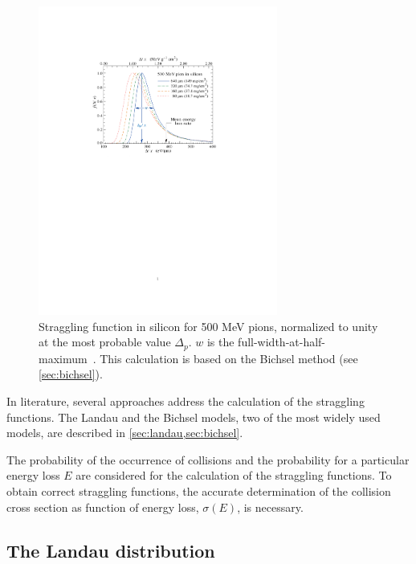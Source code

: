 \begin{figure}[htbp]
  \centering
  \includegraphics[width=0.7\textwidth, trim = 50mm 140mm
    50mm 40mm, clip]{figures/ChargeSharing/stragglingFunction_physicsReview.pdf}

    \caption{Straggling function in silicon for 500 MeV pions,
      normalized to unity at the most probable value $\Delta_{p}$. $w$
      is the full-width-at-half-maximum~\cite{Beringer:1900zz}. This
      calculation is based on the Bichsel method (see
      \cref{sec:bichsel}).}
  \label{fig:LandauDistribution}
\end{figure}

In literature, several approaches address the calculation of the
straggling functions. The Landau and the Bichsel models, two of the
most widely used models, are described in
\cref{sec:landau,sec:bichsel}.

The probability of the occurrence of collisions and the probability
for a particular energy loss $E$ are considered for the calculation of
the straggling functions. To obtain correct straggling functions, the
accurate determination of the collision cross section as function of
energy loss, $\sigma(E)$, is necessary.

\subsection{The Landau distribution}\label{sec:landau}

